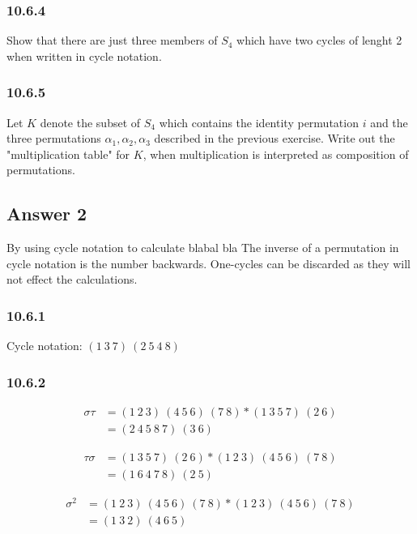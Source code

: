 \documentclass{article}
\begin{document}
	\subsubsection*{10.6.4}
	Show that there are just three members of $S_4$ which have two cycles of lenght 2 when written in cycle notation.
	
	\subsubsection*{10.6.5}
	Let $K$ denote the subset of $S_4$ which contains the identity permutation $i$ and the three permutations $\alpha_1,\alpha_2,\alpha_3$ described in the previous exercise. Write out the "multiplication table" for $K$, when multiplication is interpreted as composition of permutations.
	
	\subsection*{Answer 2}
	By using cycle notation to calculate blabal bla
	The inverse of a permutation in cycle notation is the number backwards. One-cycles can be discarded as they will not effect the calculations.
	
	\subsubsection*{10.6.1}
	Cycle notation:	$(1 \ 3 \ 7) \ (2 \ 5 \ 4 \ 8)$
	
	\subsubsection*{10.6.2}
	\[
	\begin{split}
	\sigma\tau & = (1 \ 2 \ 3) \ (4 \ 5 \ 6) \ (7 \ 8) * (1 \ 3 \ 5 \ 7) \ (2 \ 6) \\
	& = (2 \ 4 \ 5 \ 8 \ 7) \ (3 \ 6)
	\end{split}
	\]
	
	\[
	\begin{split}
	\tau\sigma & = (1 \ 3 \ 5 \ 7) \ (2 \ 6) * (1 \ 2 \ 3) \ (4 \ 5 \ 6) \ (7 \ 8) \\
	& = (1 \ 6 \ 4 \ 7 \ 8) \ (2 \ 5)
	\end{split}
	\]
	
	\[
	\begin{split}
	\sigma^2 & = (1 \ 2 \ 3) \ (4 \ 5 \ 6) \ (7 \ 8) * (1 \ 2 \ 3) \ (4 \ 5 \ 6) \ (7 \ 8) \\
	& = (1 \ 3 \ 2) \ (4 \ 6 \ 5)
	\end{split}
	\]
	
\end{document}
